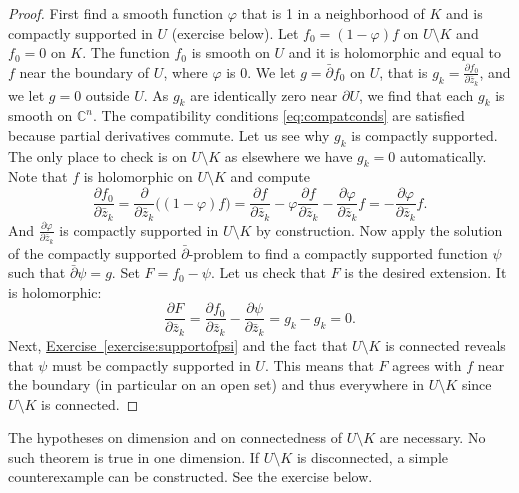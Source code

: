 \documentclass[12pt,openany]{book}
\newcommand{\C}{{\mathbb{C}}}
\theoremstyle{plain}
\theoremstyle{remark}
\theoremstyle{definition}
\theoremstyle{exercise}
\theoremstyle{example}
\newcommand{\exerciseref}[1]{\hyperref[#1]{Exercise~\ref*{#1}}}
\begin{document}
\begin{proof}
First find a smooth function $\varphi$ that is 1 in a neighborhood of
$K$ and is compactly supported in $U$ (exercise below).  Let
$f_0 = (1-\varphi)f$ on $U \setminus K$ and $f_0 = 0$ on $K$.  The function $f_0$
is smooth on $U$ and it is holomorphic
and equal to $f$ near the boundary of $U$, where $\varphi$ is 0.
We let $g = \bar{\partial} f_0$ on $U$, that is $g_k = \frac{\partial
f_0}{\partial \bar{z}_k}$,
and we let $g=0$ outside $U$.
As $g_k$ are identically zero near $\partial U$, we find that each
$g_k$ is smooth on $\C^n$.
The compatibility conditions
\eqref{eq:compatconds} are satisfied
because partial derivatives commute.
Let us see why $g_k$ is compactly supported.  The
only place to check is on $U \setminus K$ as elsewhere we have $g_k = 0$
automatically.  Note that $f$ is holomorphic on $U \setminus K$ and compute
\begin{equation*}
\frac{\partial f_0}{\partial \bar{z}_k}
=
\frac{\partial }{\partial \bar{z}_k}
\bigl((1-\varphi)f\bigr)
=
\frac{\partial f}{\partial \bar{z}_k}
- \varphi \frac{\partial f}{\partial \bar{z}_k}
- \frac{\partial \varphi}{\partial \bar{z}_k} f
=
- \frac{\partial \varphi}{\partial \bar{z}_k} f .
\end{equation*}
And 
$\frac{\partial \varphi}{\partial \bar{z}_k}$ is compactly supported in
$U \setminus K$ by construction.
Now apply the solution of the compactly supported $\bar{\partial}$-problem
to find a
compactly supported function $\psi$ such that $\bar{\partial}\psi = g$. 
Set $F = f_0 - \psi$.  Let us check that $F$ is the desired
extension.  It is holomorphic:
\begin{equation*}
\frac{\partial F}{\partial \bar{z}_k}
=
\frac{\partial f_0}{\partial \bar{z}_k}
-
\frac{\partial \psi}{\partial \bar{z}_k}
=
g_k
-
g_k
= 0 .
\end{equation*}
Next, \exerciseref{exercise:supportofpsi} and the fact that $U \setminus
K$ is connected reveals that $\psi$ must be compactly supported in $U$.
This means that $F$ agrees with $f$ near the boundary (in particular
on an open set) and thus everywhere in $U \setminus K$ since $U \setminus K$
is connected.
\end{proof}

The hypotheses on dimension and on connectedness of $U \setminus K$
are necessary.
No such theorem is true in one dimension.
If $U \setminus K$ is disconnected, a simple
counterexample can be constructed.
See the exercise below.
\end{document}
